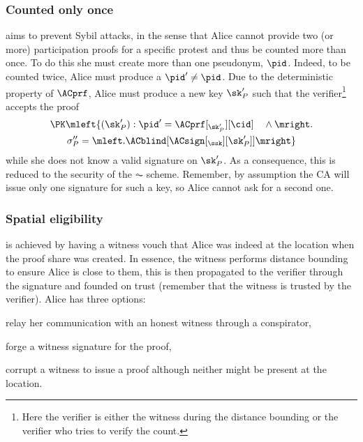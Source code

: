 \subsubsection{Counted only once}%
\label{analysis-linkability}

 aims to prevent Sybil attacks, in the sense
that Alice cannot provide two (or more) participation proofs for a
specific protest and thus be counted more than once.
To do this she must create more than one pseudonym, \(\pid\).
Indeed, to be counted twice, Alice must produce a \(\pid'\neq \pid\).
Due to the deterministic property of \(\ACprf\), Alice must produce a new key 
\(\sk_P'\) such that the verifier\footnote{%
  Here the verifier is either the witness during the distance bounding or the 
  verifier who tries to verify the count.
} accepts the proof
\begin{multline*}
\PK\mleft\{ (\sk_P') : \pid' = \ACprf[_{\sk_P'}][\cid] \quad \land \mright. \\
    \sigma_P'' = \mleft. \ACblind[\ACsign[_{\ssk}][\sk_P']] \mright\}
\end{multline*}
while she does not know a valid signature on \(\sk_P'\).
As a consequence, this is reduced to the security of the \(\AC\) scheme.
Remember, by assumption the \ac{CA} will issue only one signature for such a 
key, so Alice cannot ask for a second one.

\subsubsection{Spatial eligibility}%
\label{analysis-spatial}

 is achieved by having a witness vouch that Alice was 
indeed at the location when the proof share was created.
In essence, the witness performs distance bounding to ensure Alice is close to 
them, this is then propagated to the verifier through the signature and founded 
on trust (remember that the witness is trusted by the verifier).
Alice has three options:
\begin{enumerate*}
\item\label{spatial-DF} relay her communication with an honest witness through 
  a conspirator,
\item\label{spatial-forge} forge a witness signature for the proof,
\item corrupt a witness to issue a proof although neither might be present at 
  the location.
\end{enumerate*}

